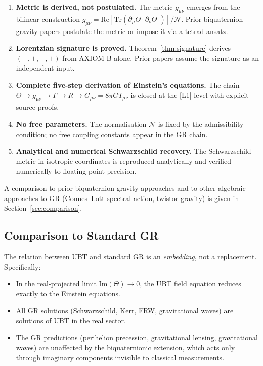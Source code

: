 \documentclass[12pt,a4paper]{article}
\theoremstyle{definition}
\theoremstyle{remark}
\newcommand{\gmn}{g_{\mu\nu}}
\newcommand{\Tmn}{T_{\mu\nu}}
\newcommand{\Tr}{\mathrm{Tr}}
\newcommand{\Re}{\mathrm{Re}}
\begin{document}
\begin{enumerate}
  \item \textbf{Metric is derived, not postulated.}
    The metric $\gmn$ emerges from the bilinear construction
    $\gmn = \Re[\Tr(\partial_\mu\Theta\cdot\partial_\nu\Theta^\dagger)]/\mathcal{N}$.
    Prior biquaternion gravity papers postulate the metric or impose it via a
    tetrad ansatz.

  \item \textbf{Lorentzian signature is proved.}
    Theorem~\ref{thm:signature} derives $(-,+,+,+)$ from AXIOM-B alone.
    Prior papers assume the signature as an independent input.

  \item \textbf{Complete five-step derivation of Einstein's equations.}
    The chain $\Theta \to \gmn \to \Gamma \to R \to G_{\mu\nu} = 8\pi G\Tmn$ is
    closed at the [L1] level with explicit source proofs.

  \item \textbf{No free parameters.}
    The normalisation $\mathcal{N}$ is fixed by the admissibility condition; no
    free coupling constants appear in the GR chain.

  \item \textbf{Analytical and numerical Schwarzschild recovery.}
    The Schwarzschild metric in isotropic coordinates is reproduced analytically
    and verified numerically to floating-point precision.
\end{enumerate}

A comparison to prior biquaternion gravity approaches and to other algebraic
approaches to GR (Connes--Lott spectral action, twistor gravity) is given in
Section~\ref{sec:comparison}.

\subsection{Comparison to Standard GR}
\label{sec:comparison_intro}

The relation between UBT and standard GR is an \emph{embedding}, not a
replacement.  Specifically:

\begin{itemize}
  \item In the real-projected limit $\mathrm{Im}(\Theta) \to 0$, the UBT field
    equation reduces exactly to the Einstein equations.
  \item All GR solutions (Schwarzschild, Kerr, FRW, gravitational waves) are
    solutions of UBT in the real sector.
  \item The GR predictions (perihelion precession, gravitational lensing,
    gravitational waves) are unaffected by the biquaternionic extension, which
    acts only through imaginary components invisible to classical measurements.
\end{itemize}
\end{document}
